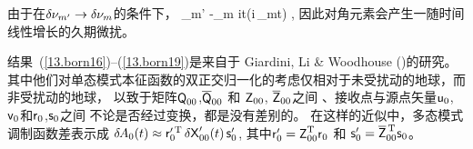 {{{{由于在$\delta\hspace{-0.1 mm}\nu_{m'}\rightarrow\delta\hspace{-0.1 mm}\nu_m$的条件下，
\eq \label{13.born19}
{\delta\hspace{-0.1 mm}\nu_{m'}
-\delta\hspace{-0.1 mm}\nu_m}\rightarrow
it\exp(i\,\delta\hspace{-0.1 mm}\nu_{m}t)
,
\en
因此对角元素会产生一随时间线性增长的久期微扰。

结果~(\ref{13.born16})--(\ref{13.born19})是来自于
Giardini, Li \& Woodhouse (\citeyear{giardini&al88})的研究。
其中他们对单态模式本征函数的双正交归一化的考虑仅相对于未受扰动的地球，而非受扰动的地球，
以致于矩阵$\mbox{${\sf Q}$}_{00}$,$\overline{\mbox{${\sf Q}$}}_{00}$ 和 $\mbox{${\sf Z}$}_{00}$, $\overline{\mbox{${\sf Z}$}}_{00}$之间
、接收点与源点矢量$\mbox{${\sf u}$}_0$,$\mbox{${\sf v}$}_0$和$\mbox{${\sf r}$}_0$,$\mbox{${\sf s}$}_0$之间
不论是否经过变换，都是没有差别的。  
在这样的近似中，多态模式调制函数差表示成
$\delta\hspace{-0.3 mm}A_0(t)\approx
\mbox{${\sf r}$}_0^{\prime\,{\rm T}}\,\mbox{$\sf \delta$}\mbox{${\sf X}$}_{00}^{\prime}(t)
\,\mbox{${\sf s}$}_0^{\prime}$, \vspace{-0.4 mm}
其中$\mbox{${\sf r}$}_0^{\prime}=\mbox{${\sf Z}$}_{00}^{\rm T}\mbox{${\sf r}$}_0$ 和
$\sss_0^{\prime}=\overline{\ssZ}_{00}^{\hspace{0.5 mm}
\raisebox{-0.4 ex}{\scriptsize\rm T}}\sss_0$。

}}}}
